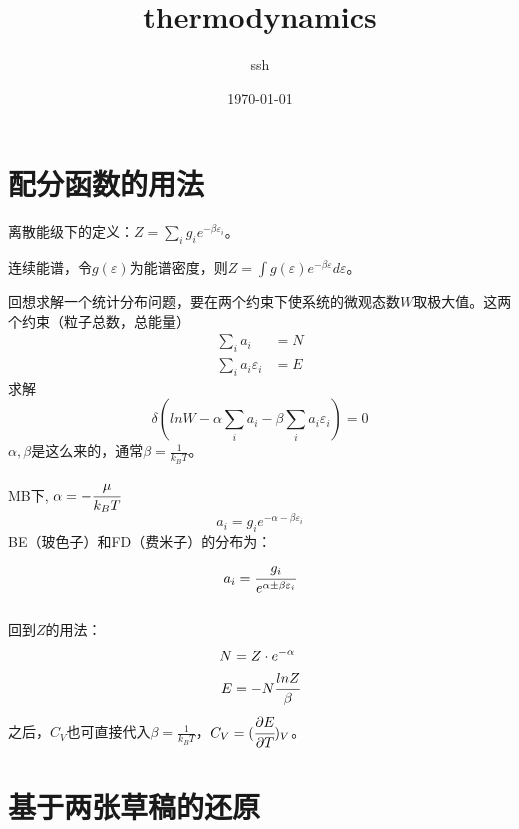 \documentclass[a4paper,12pt]{article}
\title{thermodynamics}
\author{ssh}
\date{\today}
\begin{document}
\maketitle

\section{配分函数的用法}
离散能级下的定义：$Z = \sum_i g_i e^{-\beta \varepsilon_i}$。\par
连续能谱，令$g(\varepsilon)$为能谱密度，则$Z = \int g(\varepsilon) e^{- \beta \varepsilon} d\varepsilon$。\par
回想求解一个统计分布问题，要在两个约束下使系统的微观态数$W$取极大值。这两个约束（粒子总数，总能量）
\begin{subequations}
\begin{align}
\sum_i a_i &= N \\
\sum_i a_i \varepsilon_i & = E
\end{align}
\end{subequations}
求解
\begin{equation}
\delta (lnW - \alpha \sum_i a_i - \beta \sum_i a_i \varepsilon_i) = 0
\end{equation}
$\alpha, \beta$是这么来的，通常$\beta = \frac{1}{k_B T}$。\par
MB下, $\alpha = - \cfrac{\mu}{k_B T}$
\begin{equation}
a_i = g_i e^{-\alpha - \beta \varepsilon_i}
\end{equation}
BE（玻色子）和FD（费米子）的分布为：
\begin{equation}
a_i = \cfrac{g_i}{e^{\alpha \pm \beta \varepsilon_i}}
\end{equation}
\\
\indent 回到$Z$的用法：
\begin{subequations}
\begin{align}
N &= Z \cdot e^{-\alpha} \\
E &= -N \cfrac{ln Z}{\beta} 
\end{align}
\end{subequations}
之后，$C_V$也可直接代入$\beta = \frac{1}{k_B T}$，$C_V = (\cfrac{\partial E}{\partial T})_V$。


\section{基于两张草稿的还原}
\end{document}
